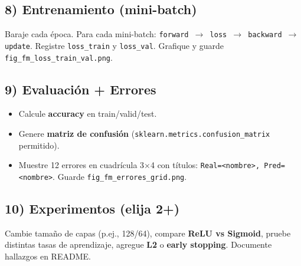 \documentclass[12pt,a4paper]{article}
\begin{document}
\subsection*{8) Entrenamiento (mini-batch)}
Baraje cada época. Para cada mini-batch: \texttt{forward $\rightarrow$ loss $\rightarrow$ backward $\rightarrow$ update}.
Registre \texttt{loss\_train} y \texttt{loss\_val}. Grafique y guarde \texttt{fig\_fm\_loss\_train\_val.png}.

\subsection*{9) Evaluación + Errores}
\begin{itemize}[leftmargin=*,nosep]
  \item Calcule \textbf{accuracy} en train/valid/test.
  \item Genere \textbf{matriz de confusión} (\texttt{sklearn.metrics.confusion\_matrix} permitido).
  \item Muestre 12 errores en cuadrícula 3$\times$4 con títulos: \texttt{Real=\textless nombre\textgreater, Pred=\textless nombre\textgreater}. Guarde \texttt{fig\_fm\_errores\_grid.png}.
\end{itemize}

\subsection*{10) Experimentos (elija 2+)}
Cambie tamaño de capas (p.ej., 128/64), compare \textbf{ReLU vs Sigmoid}, pruebe distintas tasas de aprendizaje, agregue \textbf{L2} o \textbf{early stopping}. Documente hallazgos en README.
\end{document}
